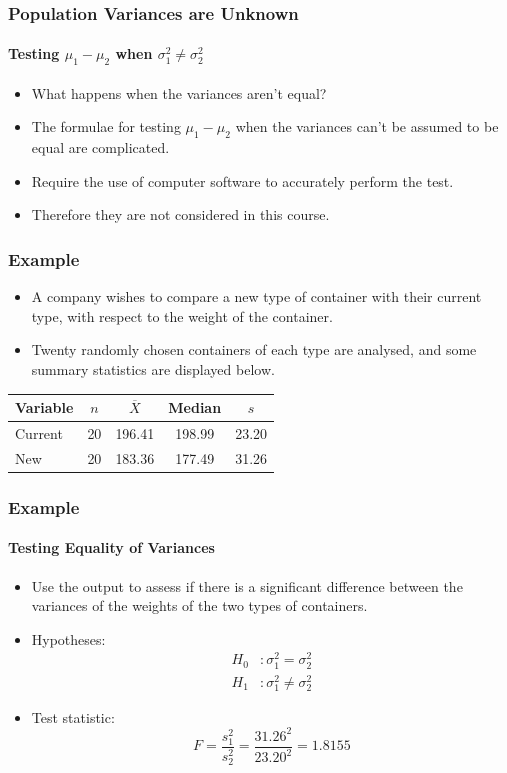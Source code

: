 \documentclass[12pt]{beamer}
\begin{document}
	\begin{frame}
		\frametitle{Population Variances are Unknown}
		\framesubtitle{Testing $\mu_1 - \mu_2$ when $\sigma_1^2 \neq \sigma_2^2$}
		
		\begin{itemize}[label={\color{blue}$\blacktriangleright$}]
			\item What happens when the variances aren't equal?
			\item The formulae for testing $\mu_1 - \mu_2$ when the variances can't be assumed to be equal are complicated.
			\item Require the use of computer software to accurately perform the test.
			\item Therefore they are not considered in this course.
		\end{itemize}
		
	\end{frame}
	\begin{frame}
		\frametitle{Example}
		
		\begin{itemize}[label={\color{blue}$\blacktriangleright$}]
			\item A company wishes to compare a new type of container with their current type, with respect to the weight of the container.
			\item Twenty randomly chosen containers of each type are analysed, and some summary statistics are displayed below.
		\end{itemize}
		
		\vspace{0.5cm}
		
		\begin{center}
			\begin{tabular}{lcccc}
				\toprule
				Variable & $n$ & $\overline{X}$ & Median & $s$ \\
				\midrule
				Current & 20 & 196.41 & 198.99 & 23.20 \\
				New     & 20 & 183.36 & 177.49 & 31.26 \\
				\bottomrule
			\end{tabular}
		\end{center}
		
	\end{frame}
	\begin{frame}
		\frametitle{Example}
		\framesubtitle{Testing Equality of Variances}
		
		\begin{itemize}[label={\color{blue}$\blacktriangleright$}]
			\item Use the output to assess if there is a significant difference between the variances of the weights of the two types of containers.
			\item Hypotheses:
			\[
			\begin{aligned}
				H_0 &: \sigma_1^2 = \sigma_2^2 \\
				H_1 &: \sigma_1^2 \neq \sigma_2^2
			\end{aligned}
			\]
			\item Test statistic:
			\[
			F = \frac{s_1^2}{s_2^2} = \frac{31.26^2}{23.20^2} = 1.8155
			\]
		\end{itemize}
		
	\end{frame}
\end{document}
